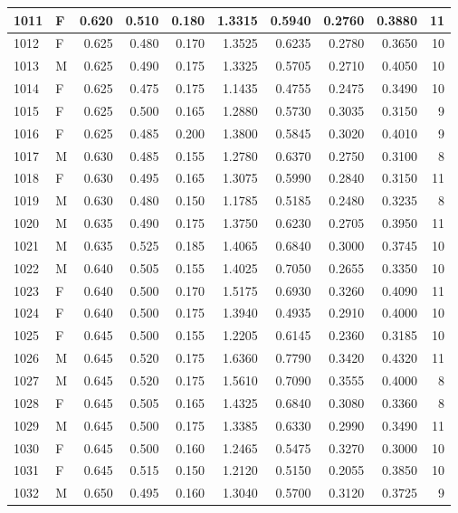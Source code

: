 \documentclass[9pt,twocolumn,twoside,]{pnas-new}
\begin{document}
\begin{tabular}{l|l|r|r|r|r|r|r|r|r}
\hline
1011 & F & 0.620 & 0.510 & 0.180 & 1.3315 & 0.5940 & 0.2760 & 0.3880 & 11\\
\hline
1012 & F & 0.625 & 0.480 & 0.170 & 1.3525 & 0.6235 & 0.2780 & 0.3650 & 10\\
\hline
1013 & M & 0.625 & 0.490 & 0.175 & 1.3325 & 0.5705 & 0.2710 & 0.4050 & 10\\
\hline
1014 & F & 0.625 & 0.475 & 0.175 & 1.1435 & 0.4755 & 0.2475 & 0.3490 & 10\\
\hline
1015 & F & 0.625 & 0.500 & 0.165 & 1.2880 & 0.5730 & 0.3035 & 0.3150 & 9\\
\hline
1016 & F & 0.625 & 0.485 & 0.200 & 1.3800 & 0.5845 & 0.3020 & 0.4010 & 9\\
\hline
1017 & M & 0.630 & 0.485 & 0.155 & 1.2780 & 0.6370 & 0.2750 & 0.3100 & 8\\
\hline
1018 & F & 0.630 & 0.495 & 0.165 & 1.3075 & 0.5990 & 0.2840 & 0.3150 & 11\\
\hline
1019 & M & 0.630 & 0.480 & 0.150 & 1.1785 & 0.5185 & 0.2480 & 0.3235 & 8\\
\hline
1020 & M & 0.635 & 0.490 & 0.175 & 1.3750 & 0.6230 & 0.2705 & 0.3950 & 11\\
\hline
1021 & M & 0.635 & 0.525 & 0.185 & 1.4065 & 0.6840 & 0.3000 & 0.3745 & 10\\
\hline
1022 & M & 0.640 & 0.505 & 0.155 & 1.4025 & 0.7050 & 0.2655 & 0.3350 & 10\\
\hline
1023 & F & 0.640 & 0.500 & 0.170 & 1.5175 & 0.6930 & 0.3260 & 0.4090 & 11\\
\hline
1024 & F & 0.640 & 0.500 & 0.175 & 1.3940 & 0.4935 & 0.2910 & 0.4000 & 10\\
\hline
1025 & F & 0.645 & 0.500 & 0.155 & 1.2205 & 0.6145 & 0.2360 & 0.3185 & 10\\
\hline
1026 & M & 0.645 & 0.520 & 0.175 & 1.6360 & 0.7790 & 0.3420 & 0.4320 & 11\\
\hline
1027 & M & 0.645 & 0.520 & 0.175 & 1.5610 & 0.7090 & 0.3555 & 0.4000 & 8\\
\hline
1028 & F & 0.645 & 0.505 & 0.165 & 1.4325 & 0.6840 & 0.3080 & 0.3360 & 8\\
\hline
1029 & M & 0.645 & 0.500 & 0.175 & 1.3385 & 0.6330 & 0.2990 & 0.3490 & 11\\
\hline
1030 & F & 0.645 & 0.500 & 0.160 & 1.2465 & 0.5475 & 0.3270 & 0.3000 & 10\\
\hline
1031 & F & 0.645 & 0.515 & 0.150 & 1.2120 & 0.5150 & 0.2055 & 0.3850 & 10\\
\hline
1032 & M & 0.650 & 0.495 & 0.160 & 1.3040 & 0.5700 & 0.3120 & 0.3725 & 9\\

\end{tabular}
\end{document}
